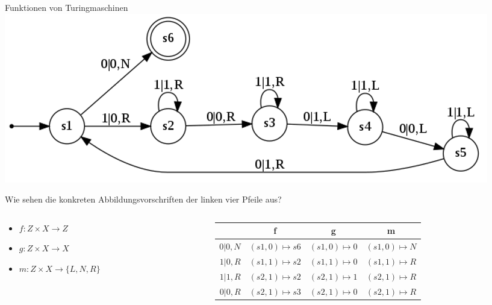 \documentclass{beamer}
\begin{document}
\begin{frame}{Funktionen von Turingmaschinen}
	\includegraphics[scale=0.4]{images/turingexample_smallspacing.png}
	
	Wie sehen die konkreten Abbildungsvorschriften der linken vier Pfeile aus?
	
	\begin{columns}
		\begin{column}{0.3\textwidth}
			
			\vspace{.2cm}
			
			\begin{itemize}
				\item $f: Z \times X \rightarrow Z$
				\item $g: Z \times X \rightarrow X$
				\item $m: Z \times X \rightarrow \{L, N, R\}$
			\end{itemize}
		\end{column}
		
		\begin{column}{0.7\textwidth}
			\begin{tabular}{r || c | c | c}
				 & f & g & m\\\hline\hline
				 
				 $0|0,N$ & $(s1, 0) \mapsto s6$ & $(s1, 0) \mapsto 0$ & $(s1, 0) \mapsto N$ \\\hline
				 
				 \pause $1|0, R$ 
				 \pause & $(s1, 1) \mapsto s2$
				 \pause & $(s1, 1) \mapsto 0$
				 \pause & $(s1, 1) \mapsto R$ \\\hline
				 
				 \pause $1|1, R$ 
				 \pause & $(s2, 1) \mapsto s2$
				 \pause & $(s2, 1) \mapsto 1$
				 \pause & $(s2, 1) \mapsto R$ \\\hline
				 
				 \pause $0|0, R$ 
				 \pause & $(s2, 1) \mapsto s3$
				 \pause & $(s2, 1) \mapsto 0$
				 \pause & $(s2, 1) \mapsto R$ \\\hline
				
			\end{tabular}
		\end{column}
	\end{columns}

\end{frame}
\end{document}
